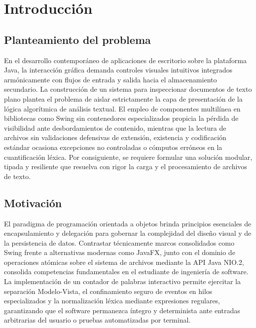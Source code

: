 \documentclass[letterpaper,12pt,oneside]{article}
\numberwithin{figure}{section}
\begin{document}
\ifdefined\PortadaPDF
  
\else
  \PackageError{reporte}{Falta definir PortadaPDF}{Inyecte la ruta privada de la portada convertida al compilar.}
\fi

\tableofcontents
\clearpage

\section{Introducción}

\subsection{Planteamiento del problema}
En el desarrollo contemporáneo de aplicaciones de escritorio sobre la plataforma Java, la interacción gráfica demanda controles visuales intuitivos integrados armónicamente con flujos de entrada y salida hacia el almacenamiento secundario. La construcción de un sistema para inspeccionar documentos de texto plano plantea el problema de aislar estrictamente la capa de presentación de la lógica algorítmica de análisis textual. El empleo de componentes multilínea en bibliotecas como Swing sin contenedores especializados propicia la pérdida de visibilidad ante desbordamientos de contenido, mientras que la lectura de archivos sin validaciones defensivas de extensión, existencia y codificación estándar ocasiona excepciones no controladas o cómputos erróneos en la cuantificación léxica. Por consiguiente, se requiere formular una solución modular, tipada y resiliente que resuelva con rigor la carga y el procesamiento de archivos de texto.

\subsection{Motivación}
El paradigma de programación orientada a objetos brinda principios esenciales de encapsulamiento y delegación para gobernar la complejidad del diseño visual y de la persistencia de datos. Contrastar técnicamente marcos consolidados como Swing frente a alternativas modernas como JavaFX, junto con el dominio de operaciones atómicas sobre el sistema de archivos mediante la API Java NIO.2, consolida competencias fundamentales en el estudiante de ingeniería de software. La implementación de un contador de palabras interactivo permite ejercitar la separación Modelo-Vista, el confinamiento seguro de eventos en hilos especializados y la normalización léxica mediante expresiones regulares, garantizando que el software permanezca íntegro y determinista ante entradas arbitrarias del usuario o pruebas automatizadas por terminal.
\end{document}
